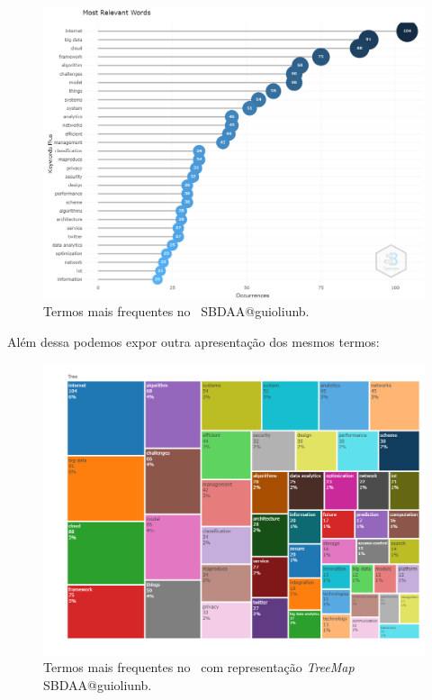 \begin{figure}
    \centering
    \includegraphics[width=1\textwidth]{experiments/guioliunb/AnaliseBibliometrica/SocialBigDataAnalysis/MOST FREQUENT WORDS.png}
    \caption{Termos mais frequentes no \dataset\ SBDAA@guioliunb.}
    \label{tab:MASSA2:Word:Occurrences}
\end{figure}

Além dessa podemos expor outra apresentação dos mesmos termos:
\begin{figure}
    \centering
    \includegraphics[width=1\textwidth]{experiments/guioliunb/AnaliseBibliometrica/SocialBigDataAnalysis/TREEMAP.png}
    \caption{Termos mais frequentes no \dataset\ com representação \textit{TreeMap} SBDAA@guioliunb.}
    \label{fig:MASSA2-TREEMAP}
\end{figure}


